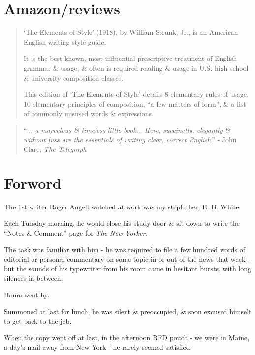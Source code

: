 \documentclass{article}
\begin{document}

\section*{Amazon/reviews}
\begin{quotation}
	`The Elements of Style' (1918), by William Strunk, Jr., is an American English writing style guide.
	
	It is the best-known, most influential prescriptive treatment of English grammar \& usage, \& often is required reading \& usage in U.S. high school \& university composition classes.
	
	This edition of `The Elements of Style' details 8 elementary rules of usage, 10 elementary principles of composition, ``a few matters of form'', \& a list of commonly misused words \& expressions.
\end{quotation}

\begin{quotation}
	``{\it $\ldots$ a marvelous \& timeless little book$\ldots$ Here, succinctly, elegantly \& without fuss are the essentials of writing clear, correct English}.'' - John Clare, {\it The Telegraph}
\end{quotation}


\section*{Forword}

The 1st writer Roger Angell watched at work was my stepfather, E. B. White.

Each Tuesday morning, he would close his study door \& sit down to write the ``Notes \& Comment'' page for {\it The New Yorker}.

The task was familiar with him - he was required to file a few hundred words of editorial or personal commentary on some topic in or out of the news that week - but the sounds of his typewriter from his room came in hesitant bursts, with long silences in between.

Hours went by.

Summoned at last for lunch, he was silent \& preoccupied, \& soon excused himself to get back to the job.

When the copy went off at last, in the afternoon RFD pouch - we were in Maine, a day's mail away from New York - he rarely seemed satisfied.
\end{document}
